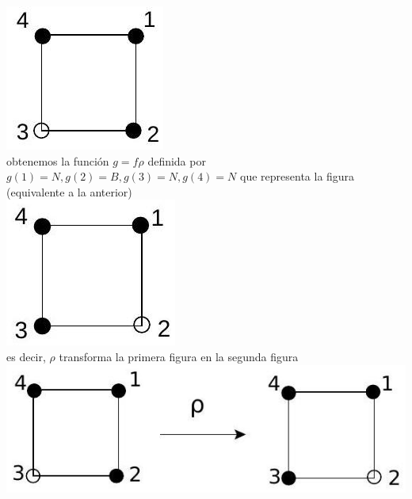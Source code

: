 \documentclass[10pt]{article}
\begin{document}
\includegraphics[max width=\textwidth, center]{2025_09_05_3ba26226ec0baddb5a03g-51(3)}\\
obtenemos la función $g=f \rho$ definida por $g(1)=N, g(2)=B, g(3)=N, g(4)=N$ que representa la figura (equivalente a la anterior)\\
\includegraphics[max width=\textwidth, center]{2025_09_05_3ba26226ec0baddb5a03g-51(1)}\\
es decir, $\rho$ transforma la primera figura en la segunda figura\\
\includegraphics[max width=\textwidth, center]{2025_09_05_3ba26226ec0baddb5a03g-51}
\end{document}

